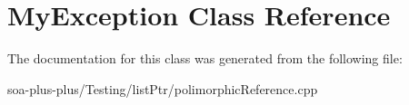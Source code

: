 \hypertarget{class_my_exception}{
\section{MyException Class Reference}
\label{class_my_exception}
}


The documentation for this class was generated from the following file:\begin{DoxyCompactItemize}
\item 
soa-\/plus-\/plus/Testing/listPtr/polimorphicReference.cpp\end{DoxyCompactItemize}
